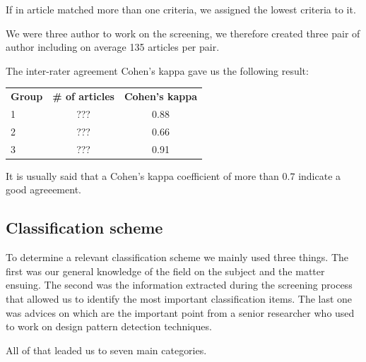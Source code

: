 \documentclass[letterpaper, 10 pt, conference]{ieeeconf}  %
\begin{document}
If in article matched more than one criteria, we assigned the lowest criteria
to it.

We were three author to work on the screening, we therefore created three pair
of author including on average 135 articles per pair.

The inter-rater agreement Cohen's kappa gave us the following result:

\begin{center}
  \begin{tabular}{ lcc }
    \bf Group & \bf \# of articles & \bf Cohen's kappa \\
    1 & ??? & 0.88 \\
    2 & ??? & 0.66 \\
    3 & ??? & 0.91 \\
  \end{tabular}
\end{center}

It is usually said that a Cohen's kappa coefficient of more than $0.7$ indicate
a good agreeement.%

\subsection{Classification scheme}

To determine a relevant classification scheme we mainly used three things.
The first was our general knowledge of the field on the subject and the matter
ensuing.
The second was the information extracted during the screening process that
allowed us to identify the most important classification items.
The last one was advices on which are the important point from a senior
researcher who used to work on design pattern detection techniques.

All of that leaded us to seven main categories.
\end{document}
